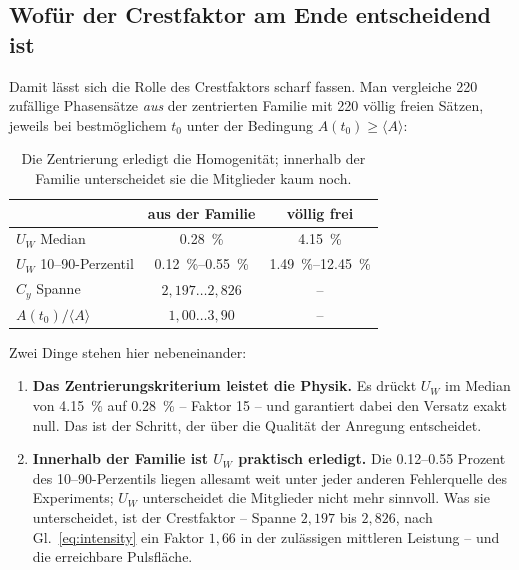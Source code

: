 \documentclass[11pt,a4paper]{article}
\newcommand{\crest}{\ensuremath{C}}
\newcommand{\Uw}{\ensuremath{U_W}}
\begin{document}
\subsection{Wofür der Crestfaktor am Ende entscheidend ist}

Damit lässt sich die Rolle des Crestfaktors scharf fassen. Man vergleiche
\num{220} zufällige Phasensätze \emph{aus} der zentrierten Familie mit
\num{220} völlig freien Sätzen, jeweils bei bestmöglichem $t_0$ unter der
Bedingung $A(t_0)\ge\langle A\rangle$:

\begin{table}[htb]
  \centering
  \caption{Die Zentrierung erledigt die Homogenität; innerhalb der Familie
  unterscheidet sie die Mitglieder kaum noch.}
  \label{tab:decisive}
  \begin{tabular}{lcc}
    \toprule
     & aus der Familie & völlig frei\\
    \midrule
    $\Uw$ Median                 & \SI{0.28}{\percent} & \SI{4.15}{\percent}\\
    $\Uw$ 10--90-Perzentil       & \SIrange{0.12}{0.55}{\percent} & \SIrange{1.49}{12.45}{\percent}\\
    $\crest_y$ Spanne            & $2{,}197 \dots 2{,}826$ & --\\
    $A(t_0)/\langle A\rangle$    & $1{,}00 \dots 3{,}90$ & --\\
    \bottomrule
  \end{tabular}
\end{table}

Zwei Dinge stehen hier nebeneinander:

\begin{enumerate}\itemsep0.3em
  \item \textbf{Das Zentrierungskriterium leistet die Physik.} Es drückt $\Uw$
        im Median von \SI{4.15}{\percent} auf \SI{0.28}{\percent} -- Faktor
        \num{15} -- und garantiert dabei den Versatz exakt null. Das ist der
        Schritt, der über die Qualität der Anregung entscheidet.
  \item \textbf{Innerhalb der Familie ist $\Uw$ praktisch erledigt.} Die
        \numrange{0.12}{0.55} Prozent des 10--90-Perzentils liegen allesamt
        weit unter jeder anderen Fehlerquelle des Experiments; $\Uw$
        unterscheidet die Mitglieder nicht mehr sinnvoll. Was sie
        unterscheidet, ist der Crestfaktor -- Spanne $2{,}197$ bis $2{,}826$,
        nach Gl.~\eqref{eq:intensity} ein Faktor $1{,}66$ in der zulässigen
        mittleren Leistung -- und die erreichbare Pulsfläche.
\end{enumerate}
\end{document}
